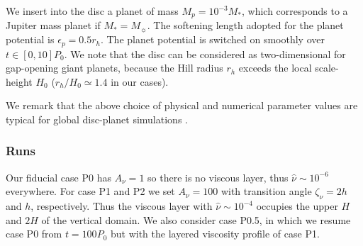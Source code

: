 We insert into the disc a planet of mass  
$M_p=10^{-3}M_*$, which corresponds to a Jupiter mass planet if
$M_*=M_{\sun}$. The softening length adopted for the planet potential is
$\epsilon_p=0.5r_h$. The planet potential is switched on 
smoothly over $t\in[0,10]P_0$. We note that the disc can be considered
as two-dimensional for gap-opening giant planets, because the Hill
radius $r_h$ exceeds the local scale-height $H_0$ ($r_h/H_0\simeq1.4$
in our cases).   

We remark that the above choice of physical and numerical parameter
values are typical for global disc-planet simulations
\citep[e.g.][]{valborro06,mignone12}.   



\subsubsection{Runs}

Our fiducial case P0 has $A_\nu=1$ so there is no viscous layer, thus
$\hat{\nu}\sim 10^{-6}$ everywhere. For case
P1 and P2 we set $A_\nu=100$ with transition angle $\zeta_\nu=2h$ and
$h$, respectively. Thus the viscous layer with $\hat{\nu}\sim10^{-4}$
occupies the upper $H$ and $2H$ of the vertical domain. We also
consider case P0.5, in which we resume case P0 from 
$t=100P_0$ but with the layered viscosity profile of case P1. 





